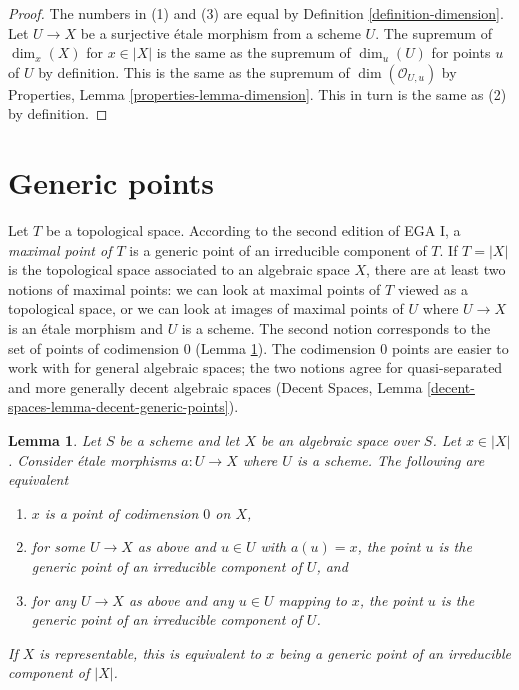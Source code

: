 \documentclass{stacks-project}
\theoremstyle{plain}
\newtheorem{lemma}[subsection]{Lemma}
\theoremstyle{definition}
\theoremstyle{remark}
\numberwithin{equation}{subsection}
\begin{document}
\begin{proof}
The numbers in (1) and (3) are equal by Definition \ref{definition-dimension}.
Let $U \to X$ be a surjective \'etale morphism from a scheme $U$.
The supremum of $\dim_x(X)$ for $x \in |X|$ is the same as the
supremum of $\dim_u(U)$ for points $u$ of $U$ by definition.
This is the same as the supremum of $\dim(\mathcal{O}_{U, u})$ by
Properties, Lemma \ref{properties-lemma-dimension}. This in turn
is the same as (2) by definition.
\end{proof}




\section{Generic points}
\label{section-generic-points}

\noindent
Let $T$ be a topological space. According to the second edition of
EGA I, a {\it maximal point of $T$} is a generic point of an irreducible
component of $T$. If $T = |X|$ is the topological space associated to
an algebraic space $X$, there are at least two notions of maximal points:
we can look at maximal points of $T$ viewed as a topological space, or
we can look at images of maximal points of $U$ where $U \to X$ is an
\'etale morphism and $U$ is a scheme. The second notion corresponds to
the set of points of codimension $0$ (Lemma \ref{lemma-codimension-0-points}).
The codimension $0$ points are easier
to work with for general algebraic spaces; the two notions
agree for quasi-separated and more generally decent algebraic spaces
(Decent Spaces, Lemma \ref{decent-spaces-lemma-decent-generic-points}).

\begin{lemma}
\label{lemma-codimension-0-points}
Let $S$ be a scheme and let $X$ be an algebraic space over $S$.
Let $x \in |X|$. Consider \'etale morphisms $a : U \to X$ where
$U$ is a scheme. The following are equivalent
\begin{enumerate}
\item $x$ is a point of codimension $0$ on $X$,
\item for some $U \to X$ as above and $u \in U$ with $a(u) = x$,
the point $u$ is the generic point of an irreducible component of $U$, and
\item for any $U \to X$ as above and any $u \in U$ mapping to $x$,
the point $u$ is the generic point of an irreducible component of $U$.
\end{enumerate}
If $X$ is representable, this is equivalent to $x$ being a generic
point of an irreducible component of $|X|$.
\end{lemma}
\end{document}
